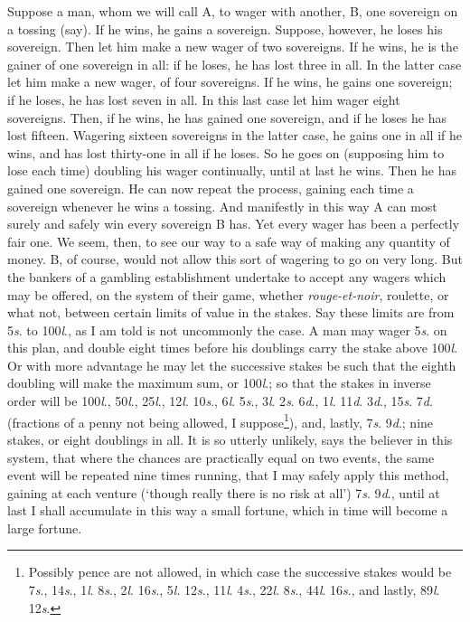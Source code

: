 \documentclass[letterpaper,12pt,oneside,openany]{memoir}
\begin{document}
Suppose a man, whom we will call A, to wager with
another, B, one sovereign on a tossing (say). If he
wins, he gains a sovereign. Suppose, however, he loses
his sovereign. Then let him make a new wager of two
sovereigns. If he wins, he is the gainer of one sovereign
in all: if he loses, he has lost three in all. In the latter
case let him make a new wager, of four sovereigns. If
he wins, he gains one sovereign; if he loses, he has
lost seven in all. In this last case let him wager
eight sovereigns. Then, if he wins, he has gained one
sovereign, and if he loses he has lost fifteen. Wagering
sixteen sovereigns in the latter case, he gains one in all
if he wins, and has lost thirty-one in all if he loses. So
he goes on (supposing him to lose each time) doubling
his wager continually, until at last he wins. Then he
has gained one sovereign. He can now repeat the
process, gaining each time a sovereign whenever he
wins a tossing. And manifestly in this way A can
most surely and safely win every sovereign B has. Yet
every wager has been a perfectly fair one. We seem,
then, to see our way to a safe way of making any
quantity of money. B, of course, would not allow this
sort of wagering to go on very long. But the bankers
of a gambling establishment undertake to accept any
wagers which may be offered, on the system of their
game, whether \textit{rouge-et-noir}, roulette, or what not,
between certain limits of value in the stakes. Say these
limits are from 5\textit{s}. to 100\textit{l}., as I am told is not uncommonly
the case. A man may wager 5\textit{s}. on this plan,
and double eight times before his doublings carry the
stake above 100\textit{l}. Or with more advantage he may let
the successive stakes be such that the eighth doubling
will make the maximum sum, or 100\textit{l}.; so that the
stakes in inverse order will be 100\textit{l}., 50\textit{l}., 25\textit{l}., 12\textit{l}. 10\textit{s}.,
6\textit{l}. 5\textit{s}., 3\textit{l}. 2\textit{s}. 6\textit{d}.,
1\textit{l}. 11\textit{d}. 3\textit{d}., 15\textit{s}. 7\textit{d}. (fractions of a
penny not being allowed, I
suppose\footnote{Possibly pence are not allowed, in which case the successive
stakes would be 7\textit{s}., 14\textit{s}., 1\textit{l}. 8\textit{s}.,
2\textit{l}. 16\textit{s}., 5\textit{l}. 12\textit{s}., 11\textit{l}. 4\textit{s}.,
22\textit{l}. 8\textit{s}.,
44\textit{l}. 16\textit{s}., and lastly, 89\textit{l}. 12\textit{s}.}), and, lastly,
7\textit{s}. 9\textit{d}.; nine stakes, or eight doublings in all. It is so
utterly unlikely, says the believer in this system, that
where the chances are practically equal on two events,
the same event will be repeated nine times running,
that I may safely apply this method, gaining at each
venture (`though really there is no risk at all') 7\textit{s}. 9\textit{d}.,
until at last I shall accumulate in this way a small
fortune, which in time will become a large fortune.
\end{document}
